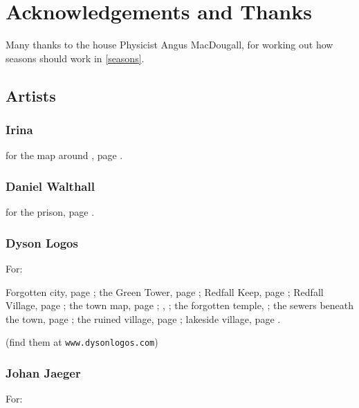 
\section*{Acknowledgements and Thanks}

\begin{multicols}{2}

Many thanks to the house Physicist Angus MacDougall, for working out how seasons should work in \autoref{seasons}.

\subsection*{Artists}

\subsubsection{Irina}
for the map around , page \pageref{Irina/greylands}.

\subsubsection{Daniel Walthall}
for the prison, page \pageref{Daniel_Walthall/prison}.

\subsubsection{Dyson Logos}

For:

Forgotten city, page \pageref{Dyson_Logos/forgotten_city};
the Green Tower, page \pageref{Dyson_Logos/green_tower};
Redfall Keep, page \pageref{Dyson_Logos/redfall_keep};
Redfall Village, page \pageref{Dyson_Logos/redfall};
the town map, page \pageref{Dyson_Logos/town};
, \pageref{Dyson_Logos/mincing_pig};
the forgotten temple, \pageref{Dyson_Logos/qualme_temple};
the sewers beneath the town, page \pageref{Dyson_Logos/sewer};
the ruined village, page \pageref{Dyson_Logos/ruined_village};
lakeside village, page \pageref{Dyson_Logos/lakeside}.

(find them at {\tt www.dysonlogos.com})

\subsubsection{Johan Jaeger}

For:


\end{multicols}
